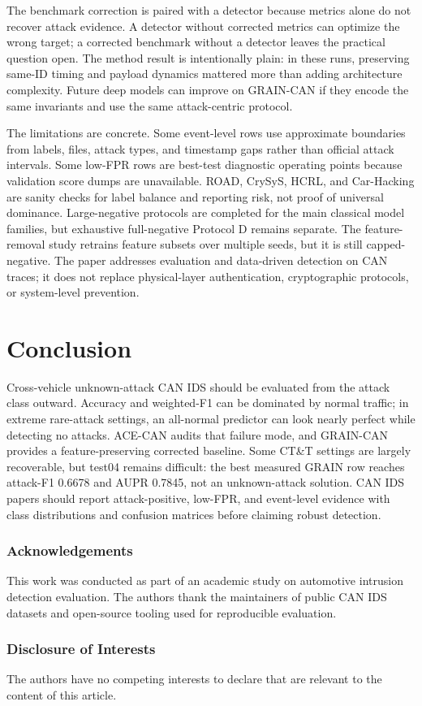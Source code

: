 \documentclass[runningheads]{llncs}%
\newenvironment{credits}{}{}
\newcommand{\ackname}{Acknowledgements}
\newcommand{\discintname}{Disclosure of Interests}
\newcommand{\method}{GRAIN-CAN}
\newcommand{\framework}{ACE-CAN}
\begin{document}
The benchmark correction is paired with a detector because metrics alone do not recover attack evidence.  A detector without corrected metrics can optimize the wrong target; a corrected benchmark without a detector leaves the practical question open.  The method result is intentionally plain: in these runs, preserving same-ID timing and payload dynamics mattered more than adding architecture complexity.  Future deep models can improve on \method{} if they encode the same invariants and use the same attack-centric protocol.

The limitations are concrete.  Some event-level rows use approximate boundaries from labels, files, attack types, and timestamp gaps rather than official attack intervals.  Some low-FPR rows are best-test diagnostic operating points because validation score dumps are unavailable.  ROAD, CrySyS, HCRL, and Car-Hacking are sanity checks for label balance and reporting risk, not proof of universal dominance.  Large-negative protocols are completed for the main classical model families, but exhaustive full-negative Protocol D remains separate.  The feature-removal study retrains feature subsets over multiple seeds, but it is still capped-negative.  The paper addresses evaluation and data-driven detection on CAN traces; it does not replace physical-layer authentication, cryptographic protocols, or system-level prevention.

\section{Conclusion}
Cross-vehicle unknown-attack CAN IDS should be evaluated from the attack class outward.  Accuracy and weighted-F1 can be dominated by normal traffic; in extreme rare-attack settings, an all-normal predictor can look nearly perfect while detecting no attacks.  \framework{} audits that failure mode, and \method{} provides a feature-preserving corrected baseline.  Some CT\&T settings are largely recoverable, but test04 remains difficult: the best measured GRAIN row reaches attack-F1 0.6678 and AUPR 0.7845, not an unknown-attack solution.  CAN IDS papers should report attack-positive, low-FPR, and event-level evidence with class distributions and confusion matrices before claiming robust detection.

\begin{credits}
\subsubsection{\ackname} This work was conducted as part of an academic study on automotive intrusion detection evaluation.  The authors thank the maintainers of public CAN IDS datasets and open-source tooling used for reproducible evaluation.

\subsubsection{\discintname} The authors have no competing interests to declare that are relevant to the content of this article.
\end{credits}
\end{document}
